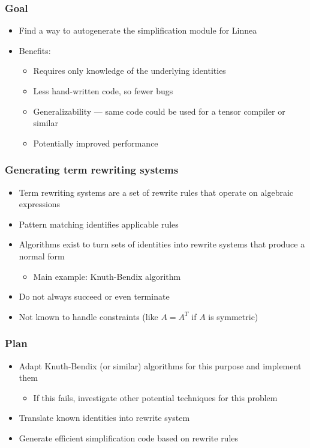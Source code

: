 \documentclass{beamer}
\begin{document}
\begin{frame}
  \frametitle{Goal}
  \begin{itemize}
  \item Find a way to autogenerate the simplification module for Linnea
  \item Benefits:
    \begin{itemize}
    \item Requires only knowledge of the underlying identities
    \item Less hand-written code, so fewer bugs
    \item Generalizability --- same code could be used for a tensor compiler or similar
    \item Potentially improved performance
    \end{itemize}
  \end{itemize}
\end{frame}

\begin{frame}
  \frametitle{Generating term rewriting systems}
  \begin{itemize}
  \item Term rewriting systems are a set of rewrite rules that operate on algebraic expressions
  \item Pattern matching identifies applicable rules
  \item Algorithms exist to turn sets of identities into rewrite systems that produce a normal form
    \begin{itemize}
    \item Main example: Knuth-Bendix algorithm
    \end{itemize}
  \item Do not always succeed or even terminate
  \item Not known to handle constraints (like $A = A^T$ if $A$ is symmetric)
  \end{itemize}
\end{frame}

\begin{frame}
  \frametitle{Plan}
  \begin{itemize}
  \item Adapt Knuth-Bendix (or similar) algorithms for this purpose and implement them
    \begin{itemize}
    \item If this fails, investigate other potential techniques for this problem
    \end{itemize}
  \item Translate known identities into rewrite system
  \item Generate efficient simplification code based on rewrite rules
  \end{itemize}
\end{frame}
\end{document}
